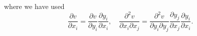 where we have used
\begin{equation}
\frac{\partial v}{\partial x_i}=\frac{\partial v}{\partial y_i}\frac{\partial y_i}{\partial x_i},\quad\frac{\partial^2v}{\partial x_i\partial x_j}=\frac{\partial^2v}{\partial y_i\partial y_j}\frac{\partial y_j}{\partial x_j}\frac{\partial y_i}{\partial x_i}.
\end{equation}

